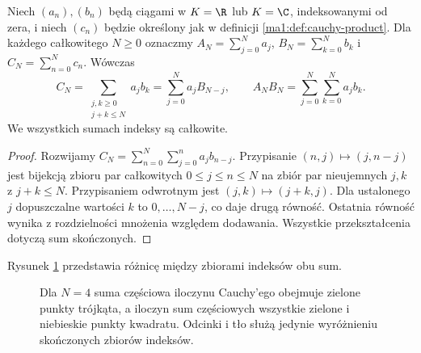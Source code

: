 \begin{lemat}
\label{ma1:lem:cauchy-finite-identities}
Niech $(a_n),(b_n)$ będą ciągami w $K=\R$ lub $K=\C$, indeksowanymi od zera, i niech $(c_n)$ będzie określony jak w definicji \ref{ma1:def:cauchy-product}. Dla każdego całkowitego $N\ge0$ oznaczmy
$A_N=\sum_{j=0}^N a_j$, $B_N=\sum_{k=0}^N b_k$ i $C_N=\sum_{n=0}^N c_n$. Wówczas
\[
 C_N=\sum_{\substack{j,k\ge0\\j+k\le N}}a_jb_k
 =\sum_{j=0}^N a_jB_{N-j},
 \qquad
 A_NB_N=\sum_{j=0}^N\sum_{k=0}^N a_jb_k.
\]
We wszystkich sumach indeksy są całkowite.
\end{lemat}
\begin{proof}
Rozwijamy $C_N=\sum_{n=0}^N\sum_{j=0}^n a_jb_{n-j}$. Przypisanie $(n,j)\mapsto(j,n-j)$ jest bijekcją zbioru par całkowitych $0\le j\le n\le N$ na zbiór par nieujemnych $j,k$ z $j+k\le N$. Przypisaniem odwrotnym jest $(j,k)\mapsto(j+k,j)$. Dla ustalonego $j$ dopuszczalne wartości $k$ to $0,\ldots,N-j$, co daje drugą równość. Ostatnia równość wynika z rozdzielności mnożenia względem dodawania. Wszystkie przekształcenia dotyczą sum skończonych.
\end{proof}
Rysunek \ref{ma1:fig:cauchy-index-sets} przedstawia różnicę
między zbiorami indeksów obu sum.

\begin{figure}[htbp]
\centering
{}
\caption{Dla $N=4$ suma częściowa iloczynu Cauchy'ego obejmuje zielone punkty trójkąta, a iloczyn sum częściowych wszystkie zielone i niebieskie punkty kwadratu. Odcinki i tło służą jedynie wyróżnieniu skończonych zbiorów indeksów.}
\label{ma1:fig:cauchy-index-sets}
\end{figure}
\FloatBarrier

